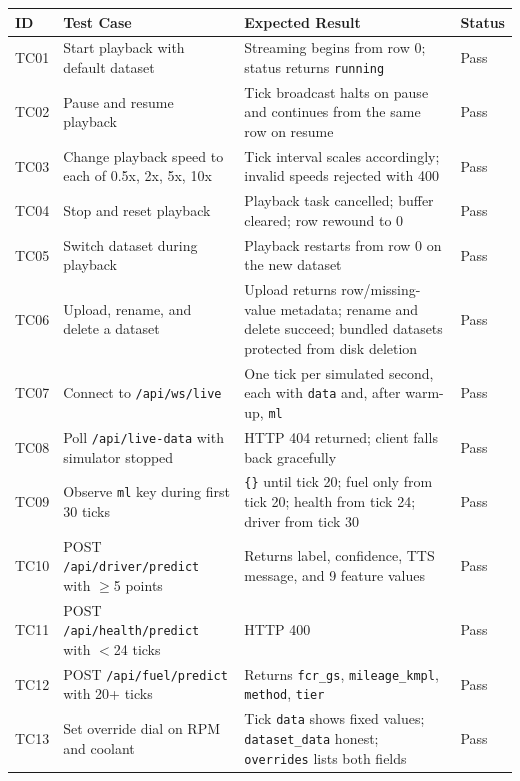 \documentclass[10pt,a4paper]{report}
\begin{document}
\begin{table}[H]
\centering
\renewcommand{\arraystretch}{1.3}
\small
\begin{tabularx}{\textwidth}{|l|X|X|l|}
\hline
\textbf{ID} & \textbf{Test Case} & \textbf{Expected Result} & \textbf{Status} \\ \hline
TC01 & Start playback with default dataset & Streaming begins from row 0; status returns \texttt{running} & Pass \\ \hline
TC02 & Pause and resume playback & Tick broadcast halts on pause and continues from the same row on resume & Pass \\ \hline
TC03 & Change playback speed to each of 0.5x, 2x, 5x, 10x & Tick interval scales accordingly; invalid speeds rejected with 400 & Pass \\ \hline
TC04 & Stop and reset playback & Playback task cancelled; buffer cleared; row rewound to 0 & Pass \\ \hline
TC05 & Switch dataset during playback & Playback restarts from row 0 on the new dataset & Pass \\ \hline
TC06 & Upload, rename, and delete a dataset & Upload returns row/missing-value metadata; rename and delete succeed; bundled datasets protected from disk deletion & Pass \\ \hline
TC07 & Connect to \texttt{/api/ws/live} & One tick per simulated second, each with \texttt{data} and, after warm-up, \texttt{ml} & Pass \\ \hline
TC08 & Poll \texttt{/api/live-data} with simulator stopped & HTTP 404 returned; client falls back gracefully & Pass \\ \hline
TC09 & Observe \texttt{ml} key during first 30 ticks & \texttt{\{\}} until tick 20; fuel only from tick 20; health from tick 24; driver from tick 30 & Pass \\ \hline
TC10 & POST \texttt{/api/driver/predict} with $\geq$5 points & Returns label, confidence, TTS message, and 9 feature values & Pass \\ \hline
TC11 & POST \texttt{/api/health/predict} with $<$24 ticks & HTTP 400 & Pass \\ \hline
TC12 & POST \texttt{/api/fuel/predict} with 20+ ticks & Returns \texttt{fcr\_gs}, \texttt{mileage\_kmpl}, \texttt{method}, \texttt{tier} & Pass \\ \hline
TC13 & Set override dial on RPM and coolant & Tick \texttt{data} shows fixed values; \texttt{dataset\_data} honest; \texttt{overrides} lists both fields & Pass \\ \hline

\end{tabularx}
\end{table}
\end{document}
